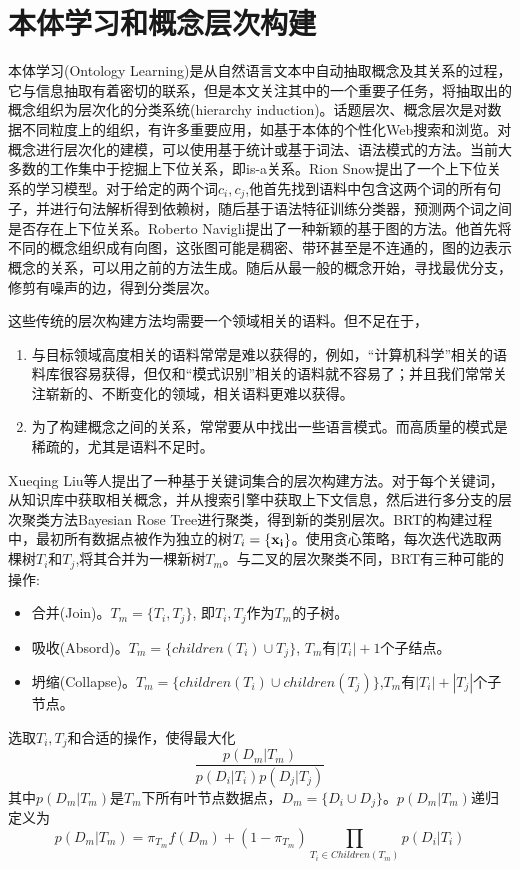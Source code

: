 \section{本体学习和概念层次构建}
本体学习(Ontology Learning)是从自然语言文本中自动抽取概念及其关系的过程，它与信息抽取有着密切的联系，但是本文关注其中的一个重要子任务，将抽取出的概念组织为层次化的分类系统(hierarchy induction)。话题层次、概念层次是对数据不同粒度上的组织，有许多重要应用，如基于本体的个性化Web搜索和浏览\cite{gauch2003ontology}。对概念进行层次化的建模，可以使用基于统计或基于词法、语法模式的方法。当前大多数的工作集中于挖掘上下位关系，即is-a关系。Rion Snow\cite{snow2004learning}提出了一个上下位关系的学习模型。对于给定的两个词$c_i,c_j$,他首先找到语料中包含这两个词的所有句子，并进行句法解析得到依赖树，随后基于语法特征训练分类器，预测两个词之间是否存在上下位关系。Roberto Navigli\cite{navigli2011graph}提出了一种新颖的基于图的方法。他首先将不同的概念组织成有向图，这张图可能是稠密、带环甚至是不连通的，图的边表示概念的关系，可以用之前的方法生成。随后从最一般的概念开始，寻找最优分支，修剪有噪声的边，得到分类层次。

这些传统的层次构建方法均需要一个领域相关的语料。但不足在于，
\begin{enumerate}
\item 与目标领域高度相关的语料常常是难以获得的，例如，``计算机科学''相关的语料库很容易获得，但仅和``模式识别''相关的语料就不容易了；并且我们常常关注崭新的、不断变化的领域，相关语料更难以获得。
\item 为了构建概念之间的关系，常常要从中找出一些语言模式。而高质量的模式是稀疏的，尤其是语料不足时。
\end{enumerate}
Xueqing Liu等人\cite{liu2012automatic}提出了一种基于关键词集合的层次构建方法。对于每个关键词，从知识库中获取相关概念，并从搜索引擎中获取上下文信息，然后进行多分支的层次聚类方法Bayesian Rose Tree进行聚类，得到新的类别层次。BRT的构建过程中，最初所有数据点被作为独立的树$T_i=\{\bf{x}_i\}$。使用贪心策略，每次迭代选取两棵树$T_i$和$T_j$,将其合并为一棵新树$T_m$。与二叉的层次聚类不同，BRT有三种可能的操作:
\begin{itemize}
\item 合并(Join)。$T_m=\{T_i, T_j\}$, 即$T_i, T_j$作为$T_m$的子树。
\item 吸收(Absord)。$T_m  = \{children(T_i) \cup T_j\}$, $T_m$有$|T_i|+1$个子结点。
\item 坍缩(Collapse)。$T_m = \{children(T_i)\cup children(T_j)\}$,$T_m$有$|T_i|+|T_j|$个子节点。
\end{itemize}
选取$T_i, T_j$和合适的操作，使得最大化
\[
\frac{p(D_m|T_m)}{p(D_i|T_i)p(D_j|T_j)}
\]
其中$p(D_m|T_m)$是$T_m$下所有叶节点数据点，$D_m=\{ D_i\cup D_j\}$。$p(D_m|T_m)$递归定义为
\[
p(D_m|T_m) = \pi_{T_m}f(D_m)+(1-\pi_{T_m}) \prod \limits_{{T_i} \in Children({T_m})} {p({D_i}|{T_i})} 
\]

